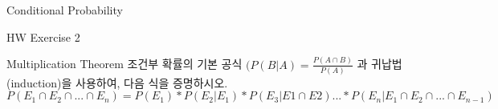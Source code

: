\begin{edXchapter}{Conditional Probability}
\begin{edXsection}{HW Exercise 2}
\begin{edXvertical}
\begin{edXproblem}{Multiplication Theorem}
조건부 확률의 기본 공식 $(P(B|A) = \frac{P(A \cap B)}{P(A)}$ 과 귀납법(induction)을 사용하여,
다음 식을 증명하시오.
\begin{equation}
P(E_1 \cap E_2 \cap ... \cap E_n) = P(E_1) * P(E_2|E_1) * P(E_3 | E1 \cap E2)...*P(E_n | E_1 \cap E_2 \cap ... \cap E_{n-1})
\end{equation}
\end{edXproblem}

\end{edXvertical}
\end{edXsection}
\end{edXchapter}




 

 


